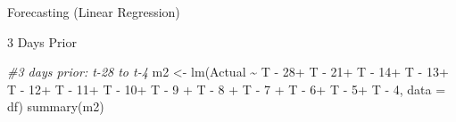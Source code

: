 \documentclass[
  ignorenonframetext,
]{beamer}
\newenvironment{Shaded}{\begin{snugshade}}{\end{snugshade}}
\newcommand{\AttributeTok}[1]{\textcolor[rgb]{0.77,0.63,0.00}{#1}}
\newcommand{\CommentTok}[1]{\textcolor[rgb]{0.56,0.35,0.01}{\textit{#1}}}
\newcommand{\FunctionTok}[1]{\textcolor[rgb]{0.00,0.00,0.00}{#1}}
\newcommand{\NormalTok}[1]{#1}
\newcommand{\OtherTok}[1]{\textcolor[rgb]{0.56,0.35,0.01}{#1}}
\newcommand{\SpecialCharTok}[1]{\textcolor[rgb]{0.00,0.00,0.00}{#1}}
\newcommand{\StringTok}[1]{\textcolor[rgb]{0.31,0.60,0.02}{#1}}
\begin{document}
\begin{frame}[fragile]{Forecasting (Linear Regression)}
\begin{block}{3 Days Prior}
\protect\hypertarget{days-prior}{}
\begin{Shaded}
\begin{Highlighting}[]
\CommentTok{\#3 days prior: t{-}28 to t{-}4}
\NormalTok{m2 }\OtherTok{\textless{}{-}} \FunctionTok{lm}\NormalTok{(Actual }\SpecialCharTok{\textasciitilde{}} \StringTok{\textasciigrave{}}\AttributeTok{T {-} 28}\StringTok{\textasciigrave{}}\SpecialCharTok{+}
                  \StringTok{\textasciigrave{}}\AttributeTok{T {-} 21}\StringTok{\textasciigrave{}}\SpecialCharTok{+}
                  \StringTok{\textasciigrave{}}\AttributeTok{T {-} 14}\StringTok{\textasciigrave{}}\SpecialCharTok{+}
                  \StringTok{\textasciigrave{}}\AttributeTok{T {-} 13}\StringTok{\textasciigrave{}}\SpecialCharTok{+}
                  \StringTok{\textasciigrave{}}\AttributeTok{T {-} 12}\StringTok{\textasciigrave{}}\SpecialCharTok{+}
                  \StringTok{\textasciigrave{}}\AttributeTok{T {-} 11}\StringTok{\textasciigrave{}}\SpecialCharTok{+}
                  \StringTok{\textasciigrave{}}\AttributeTok{T {-} 10}\StringTok{\textasciigrave{}}\SpecialCharTok{+}
                  \StringTok{\textasciigrave{}}\AttributeTok{T {-} 9}\StringTok{\textasciigrave{}} \SpecialCharTok{+}
                  \StringTok{\textasciigrave{}}\AttributeTok{T {-} 8}\StringTok{\textasciigrave{}} \SpecialCharTok{+}
                  \StringTok{\textasciigrave{}}\AttributeTok{T {-} 7}\StringTok{\textasciigrave{}} \SpecialCharTok{+}
                  \StringTok{\textasciigrave{}}\AttributeTok{T {-} 6}\StringTok{\textasciigrave{}}\SpecialCharTok{+}
                  \StringTok{\textasciigrave{}}\AttributeTok{T {-} 5}\StringTok{\textasciigrave{}}\SpecialCharTok{+}
                  \StringTok{\textasciigrave{}}\AttributeTok{T {-} 4}\StringTok{\textasciigrave{}}\NormalTok{,}
         \AttributeTok{data =}\NormalTok{ df)}
\FunctionTok{summary}\NormalTok{(m2)}
\end{Highlighting}
\end{Shaded}


\end{block}
\end{frame}
\end{document}
